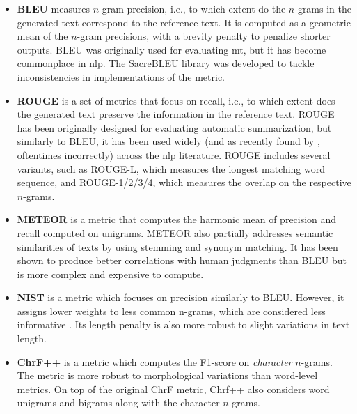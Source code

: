 {\begin{itemize}
    \item \textbf{BLEU} \cite{papineni2002bleu} measures $n$-gram precision, i.e., to which extent do the $n$-grams in the generated text correspond to the reference text.  It is computed as a geometric mean of the $n$-gram precisions, with a brevity penalty to penalize shorter outputs. BLEU was originally used for evaluating \ac{mt}, but it has become commonplace in \ac{nlp}. The SacreBLEU library \cite{post2018call}  was developed to tackle inconsistencies in implementations of the metric.
    \item \textbf{ROUGE} \cite{lin-2004-rouge} is a set of metrics that focus on recall, i.e., to which extent does the generated text preserve the information in the reference text. ROUGE has been originally designed for evaluating automatic summarization, but similarly to BLEU, it has been used widely (and as recently found by \citet{gruskyRogueScores2023}, oftentimes incorrectly) across the \ac{nlp} literature. ROUGE includes several variants, such as ROUGE-L, which measures the longest matching word sequence, and ROUGE-{1/2/3/4}, which measures the overlap on the respective $n$-grams.
    \item \textbf{METEOR} \cite{banerjee-lavie-2005-meteor} is a metric that computes the harmonic mean of precision and recall computed on unigrams. METEOR also partially addresses semantic similarities of texts by using stemming and synonym matching. It has been shown to produce better correlations with human judgments than BLEU \cite{agarwal2008meteor} but is more complex and expensive to compute.
    \item \textbf{NIST} \cite{martin2000nist} is a metric which focuses on precision similarly to BLEU. However, it assigns lower weights to less common n-grams, which are considered less informative \cite{doddington2002automatic}. Its length penalty is also more robust to slight variations in text length.
    \item \textbf{ChrF++} \cite{popovic2015chrf,popovic2017chrf} is a metric which computes the F1-score on \emph{character} $n$-grams. The metric is more robust to morphological variations than word-level metrics. On top of the original ChrF metric, Chrf++ also considers word unigrams and bigrams along with the character $n$-grams.
\end{itemize}
}

